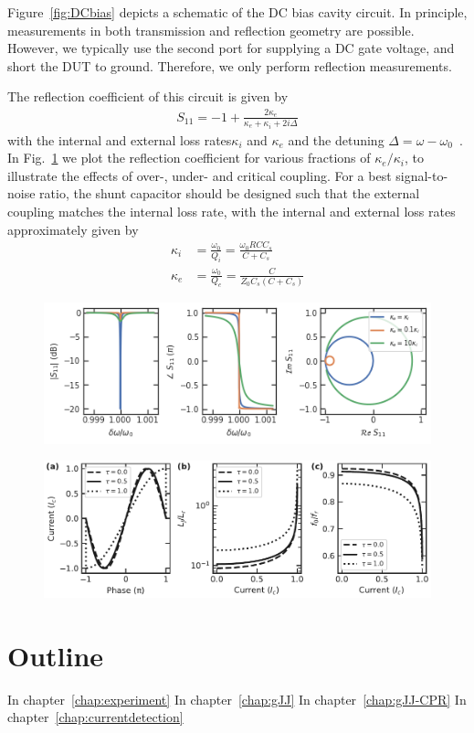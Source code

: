 Figure~\ref{fig:DCbias} depicts a schematic of the DC bias cavity circuit.
%
In principle, measurements in both transmission and reflection geometry are possible.
%
However, we typically use the second port for supplying a DC gate voltage, and short the DUT to ground.
%
Therefore, we only perform reflection measurements.

The reflection coefficient of this circuit is given by
%
\begin{align}
S_{11}=-1+\frac{2\kappa_e}{\kappa_e+\kappa_i+2i\Delta}
\end{align}
%
with the internal and external loss rates$ \kappa_i$ and $\kappa_e$ and the detuning $\Delta=\omega-\omega_0$~\cite{bosmanBroadbandArchitectureGalvanically2015c}.
%
In Fig.~\ref{fig:s11} we plot the reflection coefficient for various fractions of $\kappa_e/\kappa_i$, to illustrate the effects of over-, under- and critical coupling.
%
For a best signal-to-noise ratio, the shunt capacitor should be designed such that the external coupling matches the internal loss rate, with the internal and external loss rates approximately given by
%
\begin{align}
\kappa_i &= \frac{\omega_0}{Q_i} = \frac{\omega_0 R C C_s}{C+C_s} \\
\kappa_e &= \frac{\omega_0}{Q_e} = \frac{C}{Z_0 C_s (C+C_s)}
\end{align}
%


\begin{figure}
	\centering
	\includegraphics[width=\linewidth]{chapter-introduction/figs/S11}
	\caption{}
	\label{fig:s11}
\end{figure}


\begin{figure}
	\centering
	\includegraphics[width=\linewidth]{chapter-gJJ-CPR/figs/SMFigure-influence}
	\caption{}
	\label{fig:smfigure-influence}
\end{figure}


\section{Outline}
In chapter~\ref{chap:experiment}
%
In chapter~\ref{chap:gJJ}
%
In chapter~\ref{chap:gJJ-CPR}
%
In chapter~\ref{chap:currentdetection}
%



